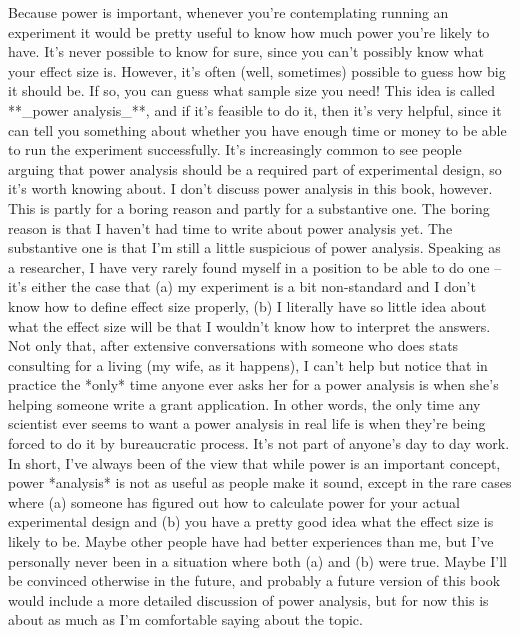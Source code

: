 Because power is important, whenever you're contemplating running an experiment it would be pretty useful to know how much power you're likely to have. It's never possible to know for sure, since you can't possibly know what your effect size is. However, it's often (well, sometimes) possible to guess how big it should be. If so, you can guess what sample size you need! This idea is called **_power analysis_**, and if it's feasible to do it, then it's very helpful, since it can tell you something about whether you have enough time or money to be able to run the experiment successfully. It's increasingly common to see people arguing that power analysis should be a required part of experimental design, so it's worth knowing about. I don't discuss power analysis in this book, however. This is partly for a boring reason and partly for a substantive one. The boring reason is that I haven't had time to write about power analysis yet. The substantive one is that I'm still a little suspicious of power analysis. Speaking as a researcher, I have very rarely found myself in a position to be able to do one -- it's either the case that (a) my experiment is a bit non-standard and I don't know how to define effect size properly, (b) I literally have so little idea about what the effect size will be that I wouldn't know how to interpret the answers. Not only that, after extensive conversations with someone who does stats consulting for a living (my wife, as it happens), I can't help but notice that in practice the *only* time anyone ever asks her for a power analysis is when she's helping someone write a grant application. In other words, the only time any scientist ever seems to want a power analysis in real life is when they're being forced to do it by bureaucratic process. It's not part of anyone's day to day work. In short, I've always been of the view that while power is an important concept, power *analysis* is not as useful as people make it sound, except in the rare cases where (a) someone has figured out how to calculate power for your actual experimental design and (b) you have a pretty good idea what the effect size is likely to be. Maybe other people have had better experiences than me, but I've personally never been in a situation where both (a) and (b) were true. Maybe I'll be convinced otherwise in the future, and probably a future version of this book would include a more detailed discussion of power analysis, but for now this is about as much as I'm comfortable saying about the topic.



